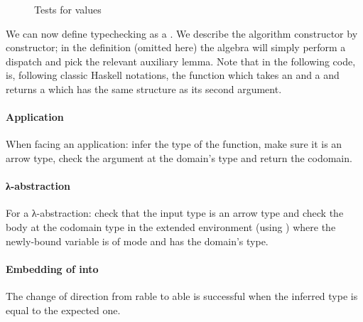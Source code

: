 \begin{figure}[h]
\begin{minipage}[t]{0.45\textwidth}
\end{minipage}\hfill
\begin{minipage}[t]{0.45\textwidth}
\end{minipage}
\caption{Tests for  values}
\end{figure}

We can now define typechecking as a \semrec{}. We describe the algorithm constructor
by constructor; in the  definition (omitted here) the algebra will
simply perform a dispatch and pick the relevant auxiliary lemma. Note that in the
following code, \AF{\_<\$\_} is, following classic Haskell notations, the function
which takes an  and a { } and returns a { }
which has the same structure as its second argument.

\paragraph{Application} When facing an application: infer the type of the function,
make sure it is an arrow type, check the argument at the domain's type and return
the codomain.
\begin{agdasnippet}
\end{agdasnippet}
%
\paragraph{λ-abstraction} For a λ-abstraction: check that the input
type  is an arrow type and check the body  at the
codomain type in the extended environment (using ) where the
newly-bound variable is of mode  and has the domain's type.
\begin{agdasnippet}
\end{agdasnippet}
%
\paragraph{Embedding of  into } The change of
direction from rable to able is successful when the
inferred type is equal to the expected one.
\begin{agdasnippet}
\end{agdasnippet}
%
